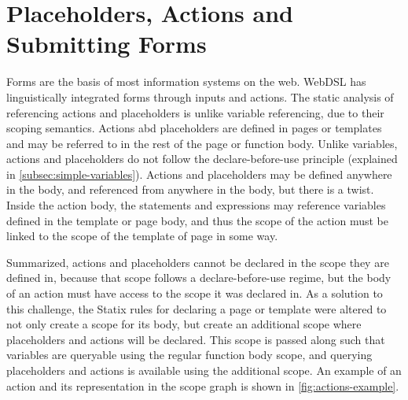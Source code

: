   \section{\label{sec:actions-and-submitting-forms}Placeholders, Actions and Submitting Forms}

    Forms are the basis of most information systems on the web. WebDSL has linguistically integrated forms through inputs and actions. The static analysis of referencing actions and placeholders is unlike variable referencing, due to their scoping semantics. Actions abd placeholders are defined in pages or templates and may be referred to in the rest of the page or function body. Unlike variables, actions and placeholders do not follow the declare-before-use principle (explained in \cref{subsec:simple-variables}). Actions and placeholders may be defined anywhere in the body, and referenced from anywhere in the body, but there is a twist. Inside the action body, the statements and expressions may reference variables defined in the template or page body, and thus the scope of the action must be linked to the scope of the template of page in some way.
    
    Summarized, actions and placeholders cannot be declared in the scope they are defined in, because that scope follows a declare-before-use regime, but the body of an action must have access to the scope it was declared in. As a solution to this challenge, the Statix rules for declaring a page or template were altered to not only create a scope for its body, but create an additional scope where placeholders and actions will be declared. This scope is passed along such that variables are queryable using the regular function body scope, and querying placeholders and actions is available using the additional scope. An example of an action and its representation in the scope graph is shown in \cref{fig:actions-example}.


